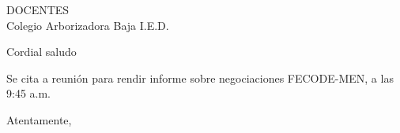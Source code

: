 \documentclass[letterpaper,spanish,11pt]{letter}
\begin{document}
\begin{letter}{DOCENTES\\Colegio Arborizadora Baja I.E.D.}
	
\opening{Cordial saludo}
Se cita a reunión para rendir informe sobre negociaciones FECODE-MEN, a las 9:45 a.m.
\closing{Atentamente,}


\end{letter}
\end{document}
